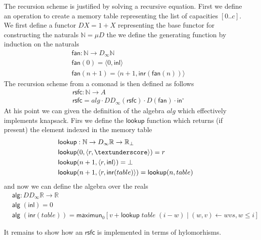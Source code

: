 \documentclass{article}
\newcommand{\N}{\mathbb{N}}
\newcommand{\Nat}{\N}
\newcommand{\R}{\mathbb{R}}
\newcommand{\comp}{\cdot}
\newcommand{\operator}[1]{\textsf{#1}}
\newcommand{\inl}{\operator{inl}}
\newcommand{\inr}{\operator{inr}}
\newcommand{\InOp}{\operator{in}^{\circ}}
\newcommand{\pair}[2]{\langle #1, #2 \rangle}
\begin{document}
The recursion scheme is justified by solving a recursive equation.  First we
define an operation to create a memory table representing the list of capacities
$[0..c]$. We first define a functor $D X = 1 + X$ representing the base functor
for constructing the naturals $\Nat = \mu D$ the we define the generating
function by induction on the naturals
\begin{align*}
  & \operator{fan} : \Nat \to D_{\infty}\Nat\\
  & \operator{fan} (0)    = \pair{0}{\inl}\\
  & \operator{fan} (n+1)  = \pair{n+1}{\inr (\operator{fan}(n))}
\end{align*}
The recursion scheme from a comonad is then defined as follows
\begin{align*}
  & \operator{rsfc} : \Nat \to A\\
  & \operator{rsfc} = alg \comp DD_{\infty}(\operator{rsfc}) \comp D(\operator{fan}) \comp \InOp
\end{align*}
At his point we can given the definition of the algebra $alg$ which effectively implements knapsack.
Firs we define the $\operator{lookup}$ function which returns (if present) the element indexed in the memory table
\begin{align*}
  & \operator{lookup} : \Nat \to D_{\infty} \R \to \R_{\bot}\\
  & \operator{lookup} (0,   \pair{r}{\textunderscore})  = r\\
  & \operator{lookup} (n+1, \pair{r}{\inl})         = \bot\\
  & \operator{lookup} (n+1, \pair{r}{\inr(table)})  = \operator{lookup} (n, table)
\end{align*}
and now we can define the algebra over the reals
\begin{align*}
  & \operator{alg} : DD_{\infty} \R \to \R\\
  & \operator{alg}\; (\inl)  = 0\\
  & \operator{alg}\; (\inr(table))  = \operator{maximun}_{0} [ v + \operator{lookup}\; table\; (i - w) \mid (w,v) \leftarrow wvs, w \le i]
\end{align*}

It remains to show how an $\operator{rsfc}$ is implemented in terms of
hylomorhisms.
\end{document}
